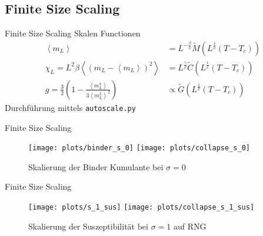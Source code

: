 \documentclass{beamer}
\newcommand{\brac}[1]{\ensuremath{\left(#1\right)}}
\newcommand{\avg}[1]{\left< #1 \right>}
\begin{document}
    \subsection{Finite Size Scaling}
        \begin{frame}{Finite Size Scaling}
            Skalen Functionen
            \begin{align}
                \label{eq:fsscaling:m}
                \avg{m_L} &= L^{-\frac{\beta}{\nu}} \tilde{M}\brac{L^\frac{1}{\nu}\brac{T-T_c}}\\
                \label{eq:fsscaling:chi}
                \chi_L    = L^{2} \beta \avg{\brac{m_{L}-\avg{m_{L}}}^2} &= L^{\frac{\gamma}{\nu}} \tilde{C}\brac{L^\frac{1}{\nu}\brac{T-T_c}}\\
                \label{eq:fsscaling:g}
                g         = \frac{3}{2}\brac{1-\frac{\avg{m_{L}^4}}{3\avg{m_{L}^2}^2}} &\propto \tilde{G}\brac{L^\frac{1}{\nu}\brac{T-T_c}}
            \end{align}
            \pause
            Durchführung mittels \texttt{autoscale.py} \cite{autoscale2009}
        \end{frame}
        \begin{frame}{Finite Size Scaling}
            \begin{figure}[htbp]
                \centering
                \subfigure
                {
                    \label{sfig:gettingCrit:binder_s_0}
                    \texttt{[image: plots/binder\_s\_0]}
                }
                \subfigure
                {
                    \label{sfig:gettingCrit:collapse_s_0}
                    \texttt{[image: plots/collapse\_s\_0]}
                }
                \caption
                {
                    Skalierung der Binder Kumulante bei \(\sigma = 0\)
                }
                \label{fig:gettingCrit}
            \end{figure}
        \end{frame}
        \begin{frame}{Finite Size Scaling}
            \begin{figure}[htbp]
                \centering
                \subfigure
                {
                    \label{sfig:gettingCrit:s_1_sus}
                    \texttt{[image: plots/s\_1\_sus]}
                }
                \subfigure
                {
                    \label{sfig:gettingCrit:collapse_s_1_sus}
                    \texttt{[image: plots/collapse\_s\_1\_sus]}
                }
                \caption
                {
                    Skalierung der Suszeptibilität bei \(\sigma = 1\) auf RNG
                }
                \label{fig:gettingCrit}
            \end{figure}
        \end{frame}
\end{document}
